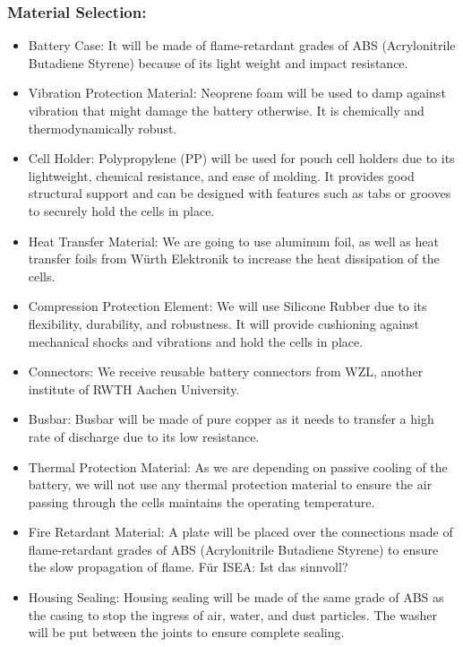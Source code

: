 \subsubsection{Material Selection:}
\begin{itemize}

\item Battery Case: It will be made of flame-retardant grades of ABS (Acrylonitrile Butadiene Styrene) because of its light weight and impact resistance. 

\item Vibration Protection Material: Neoprene foam will be used to damp against vibration that might damage the battery otherwise. It is chemically and thermodynamically robust.

\item Cell Holder: Polypropylene (PP) will be used for pouch cell holders due to its lightweight, chemical resistance, and ease of molding. It provides good structural support and can be designed with features such as tabs or grooves to securely hold the cells in place.

\item Heat Transfer Material: We are going to use aluminum foil, as well as heat transfer foils from Würth Elektronik to increase the heat dissipation of the cells.

\item Compression Protection Element: We will use Silicone Rubber due to its flexibility, durability, and robustness. It will provide cushioning against mechanical shocks and vibrations and hold the cells in place.
\item Connectors: We receive reusable battery connectors from WZL, another institute of RWTH Aachen University. 

\item Busbar: Busbar will be made of pure copper as it needs to transfer a high rate of discharge due to its low resistance.

\item Thermal Protection Material: As we are depending on passive cooling of the battery, we will not use any thermal protection material to ensure the air passing through the cells maintains the operating temperature.

\item Fire Retardant Material: A plate will be placed over the connections made of flame-retardant grades of ABS (Acrylonitrile Butadiene Styrene) to ensure the slow propagation of flame. Für ISEA: Ist das sinnvoll?

\item Housing Sealing: Housing sealing will be made of the same grade of ABS as the casing to stop the ingress of air, water, and dust particles. The washer will be put between the joints to ensure complete sealing.


\end{itemize}

